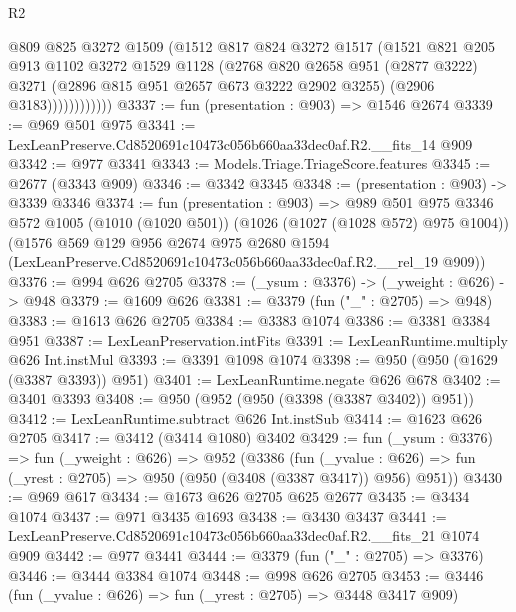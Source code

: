 \begin{lexlean}{R2}
\begin{coremodule}
                    @809
                    @825
                    @3272
                    @1509
                    (@1512
                      @817
                      @824
                      @3272
                      @1517
                      (@1521
                        @821
                        @205
                        @913
                        @1102
                        @3272
                        @1529
                        @1128
                        (@2768
                          @820
                          @2658
                          @951
                          (@2877 @3222)
                          @3271
                          (@2896 @815 @951 @2657 @673 @3222 @2902 @3255)
                          (@2906 @3183))))))))))))
@3337 := fun (presentation : @903) => @1546 @2674
@3339 := @969 @501 @975
@3341 := LexLeanPreserve.Cd8520691c10473c056b660aa33dec0af.R2.__fits_14 @909
@3342 := @977 @3341
@3343 := Models.Triage.TriageScore.features
@3345 := @2677 (@3343 @909)
@3346 := @3342 @3345
@3348 := (presentation : @903) -> @3339 @3346
@3374 := fun (presentation : @903) =>
  @989
    @501
    @975
    @3346
    @572
    @1005
    (@1010 (@1020 @501))
    (@1026 (@1027 (@1028 @572) @975 @1004))
    (@1576
      @569
      @129
      @956
      @2674
      @975
      @2680
      @1594
      (LexLeanPreserve.Cd8520691c10473c056b660aa33dec0af.R2.__rel_19 @909))
@3376 := @994 @626 @2705
@3378 := (_ysum : @3376) -> (_yweight : @626) -> @948
@3379 := @1609 @626
@3381 := @3379 (fun ("_" : @2705) => @948)
@3383 := @1613 @626 @2705
@3384 := @3383 @1074
@3386 := @3381 @3384 @951
@3387 := LexLeanPreservation.intFits
@3391 := LexLeanRuntime.multiply @626 Int.instMul
@3393 := @3391 @1098 @1074
@3398 := @950 (@950 (@1629 (@3387 @3393)) @951)
@3401 := LexLeanRuntime.negate @626 @678
@3402 := @3401 @3393
@3408 := @950 (@952 (@950 (@3398 (@3387 @3402)) @951))
@3412 := LexLeanRuntime.subtract @626 Int.instSub
@3414 := @1623 @626 @2705
@3417 := @3412 (@3414 @1080) @3402
@3429 := fun (_ysum : @3376) =>
  fun (_yweight : @626) =>
  @952
    (@3386
      (fun (_yvalue : @626) => fun (_yrest : @2705) => @950 (@950 (@3408 (@3387 @3417)) @956) @951))
@3430 := @969 @617
@3434 := @1673 @626 @2705 @625 @2677
@3435 := @3434 @1074
@3437 := @971 @3435 @1693
@3438 := @3430 @3437
@3441 := LexLeanPreserve.Cd8520691c10473c056b660aa33dec0af.R2.__fits_21 @1074 @909
@3442 := @977 @3441
@3444 := @3379 (fun ("_" : @2705) => @3376)
@3446 := @3444 @3384 @1074
@3448 := @998 @626 @2705
@3453 := @3446 (fun (_yvalue : @626) => fun (_yrest : @2705) => @3448 @3417 @909)

\end{coremodule}
\end{lexlean}
